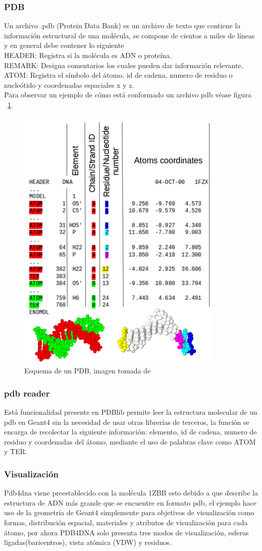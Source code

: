 \subsubsection{PDB}
Un archivo .pdb (Protein Data Bank) es un archivo de texto que contiene la información estructural de una molécula, se compone de cientos a miles de líneas y en general debe contener lo siguiente\\
HEADER: Registra si la molécula es ADN o proteína.\\
REMARK: Designa comentarios los cuales pueden dar información relevante.\\
ATOM: Registra el símbolo del átomo, id de cadena, numero de residuo o nucleótido y coordenadas espaciales x y z. \\
Para observar un ejemplo de cómo está conformado un archivo pdb véase figura ~\ref{fig:pdbesq}.
\begin{figure}[htbp]
    \centering
    \includegraphics[width=.5\linewidth]{./Figures/pdb.png}
    \caption[Esquema de un PDB]{Esquema de un PDB, imagen tomada de\cite{pdblib}} %
    \label{fig:pdbesq}
\end{figure}

\subsubsection{pdb reader}
Está funcionalidad presente en PDBlib permite leer la estructura molecular de un pdb en Geant4 sin la necesidad de usar otras librerías de terceros, la función se encarga de recolectar la siguiente información: elemento, id de cadena, numero de residuo y coordenadas del átomo, mediante el uso de palabras clave como ATOM y TER\cite{pdblib}.
\subsubsection{Visualización}
Pdb4dna viene preestablecido con la molécula 1ZBB esto debido a que describe la estructura de ADN más grande que se encuentre en formato pdb, el ejemplo hace uso de la geometría de Geant4 simplemente para objetivos de visualización como formas, distribución espacial, materiales y atributos de visualización para cada átomo, por ahora PDB4DNA solo presenta tres modos de visualización, esferas ligadas(baricentros), vista atómica (VDW) y residuos\cite{pdblib}.

